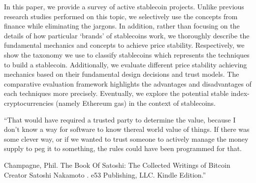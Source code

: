 In this paper, we provide a survey of active stablecoin projects. Unlike previous research studies performed on this topic, we selectively use the concepts from finance while eliminating the jargons. In addition, rather than focusing on the details of how particular `brands' of stablecoins work, we thoroughly describe the fundamental mechanics and concepts to achieve price stability. Respectively, we show the taxonomy we use to classify stablecoins which represents the techniques to build a stablecoin. Additionally, we evaluate different price stability achieving mechanics based on their fundamental design decisions and trust models. The comparative evaluation framework highlights the advantages and disadvantages of each techniques more precisely. Eventually, we explore the potential stable index-cryptocurrencies (namely Ethereum gas) in the context of stablecoins.

``That would have required a trusted party to determine the value, because I don’t know a way for software to know thereal world value of things. If there was some clever way, or if we wanted to trust someone to actively manage the money supply to peg it to something, the rules could have been programmed for that.

Champagne, Phil. The Book Of Satoshi: The Collected Writings of Bitcoin Creator Satoshi Nakamoto . e53 Publishing, LLC. Kindle Edition.''